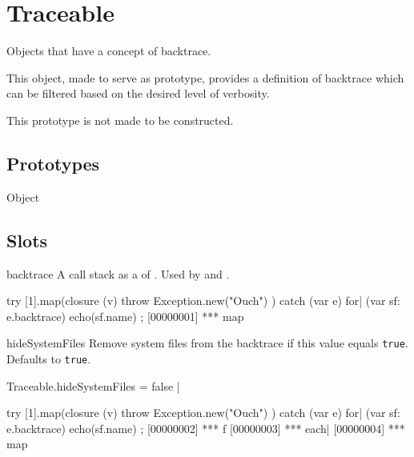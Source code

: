 
\section{Traceable}
Objects that have a concept of backtrace.

This object, made to serve as prototype, provides a definition of backtrace
which can be filtered based on the desired level of verbosity.

This prototype is not made to be constructed.

\subsection{Prototypes}
\begin{refObjects}
\item[Object]
\end{refObjects}

\subsection{Slots}

\begin{urbiscriptapi}
\item[backtrace] A call stack as a  of
  .  Used by  and
  .
\begin{urbiscript}
try
{
  [1].map(closure (v) { throw Exception.new("Ouch") })
}
catch (var e)
{
  for| (var sf: e.backtrace)
    echo(sf.name)
};
[00000001] *** map
\end{urbiscript}


\item[hideSystemFiles] Remove system files from the backtrace if this value
  equals \lstinline|true|.  Defaults to \lstinline|true|.
\begin{urbiscript}
Traceable.hideSystemFiles = false |

try
{
  [1].map(closure (v) { throw Exception.new("Ouch") })
}
catch (var e)
{
  for| (var sf: e.backtrace)
    echo(sf.name)
};
[00000002] *** f
[00000003] *** each|
[00000004] *** map
\end{urbiscript}
\end{urbiscriptapi}


